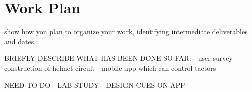 \documentclass{interim}
\begin{document}
\section{Work Plan}

show how you plan to organize your work, identifying intermediate deliverables and dates.

BRIEFLY DESCRIBE WHAT HAS BEEN DONE SO FAR:
- user survey
- construction of helmet circuit
- mobile app which can control tactors

NEED TO DO
- LAB STUDY
    - DESIGN CUES ON APP



\end{document}
